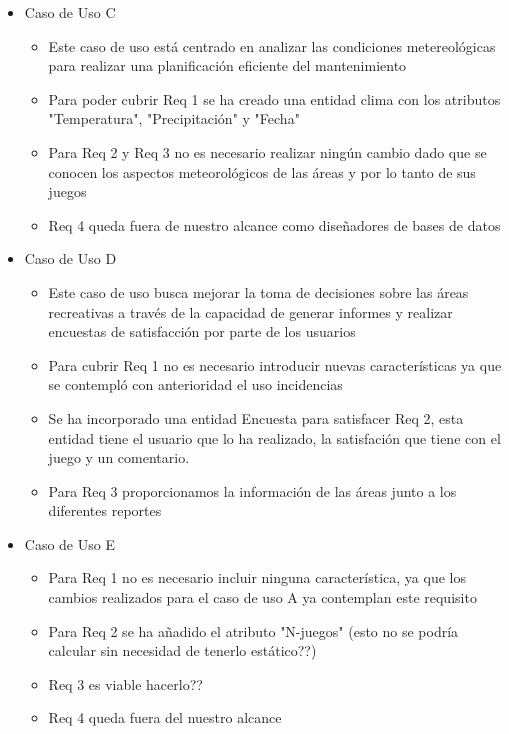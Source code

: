 \documentclass[]{article}
\begin{document}
\begin{itemize}
\begin{itemize}
\begin{itemize}
        \end{itemize}
        \item Caso de Uso C
        \begin{itemize}
            \item Este caso de uso está centrado en analizar las condiciones metereológicas para realizar una planificación eficiente del mantenimiento
            \item Para poder cubrir Req 1 se ha creado una entidad clima con los atributos "Temperatura", "Precipitación" y "Fecha"
            \item Para Req 2 y Req 3 no es necesario realizar ningún cambio dado que se conocen los aspectos meteorológicos de las áreas y por lo tanto de sus juegos
            \item Req 4 queda fuera de nuestro alcance como diseñadores de bases de datos
        \end{itemize}
        \item Caso de Uso D
        \begin{itemize}
            \item Este caso de uso busca mejorar la toma de decisiones sobre las áreas recreativas a través de la capacidad de generar informes y realizar encuestas de satisfacción por parte de los usuarios
            \item Para cubrir Req 1 no es necesario introducir nuevas características ya que se contempló con anterioridad el uso incidencias
            \item Se ha incorporado una entidad Encuesta para satisfacer Req 2, esta entidad tiene el usuario que lo ha realizado, la satisfación que tiene con el juego y un comentario. 
            \item Para Req 3 proporcionamos la información de las áreas junto a los diferentes reportes
        \end{itemize}
        \item Caso de Uso E
        \begin{itemize}
            \item Para Req 1 no es necesario incluir ninguna característica, ya que los cambios realizados para el caso de uso A ya contemplan este requisito
            \item Para Req 2 se ha añadido el atributo "N-juegos" (esto no se podría calcular sin necesidad de tenerlo estático??)
            \item Req 3 es viable hacerlo??
            \item Req 4 queda fuera del nuestro alcance
        \end{itemize}
    \end{itemize}
\end{itemize}
\end{document}
